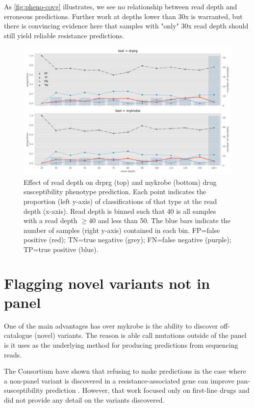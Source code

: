 As \autoref{fig:pheno-covg} illustrates, we see no relationship between \ont{} read depth and erroneous predictions. Further work at depths lower than 30x is warranted, but there is convincing evidence here that samples with "only" 30x \ont{} read depth should still yield reliable resistance predictions. 

\begin{figure}
\begin{center}
\includegraphics[width=0.90\columnwidth]{Chapter3/Figs/phenotype_coverage.png}
\caption{{Effect of \ont{} read depth on drprg (top) and mykrobe (bottom) drug susceptibility phenotype prediction. Each point indicates the proportion (left y-axis) of classifications of that type at the read depth (x-axis). Read depth is binned such that 40 is all samples with a read depth $\ge40$ and less than 50. The blue bars indicate the number of samples (right y-axis) contained in each bin. FP=false positive (red); TN=true negative (grey); FN=false negative (purple); TP=true positive (blue).
{\label{fig:pheno-covg}}
}}
\end{center}
\end{figure}
\section{Flagging novel variants not in panel}
\label{sec:drprg-discover}

One of the main advantages \drprg{} has over mykrobe is the ability to discover off-catalogue (novel) variants. The reason \drprg{} is able call mutations outside of the panel is it uses \pandora{} as the underlying method for producing predictions from sequencing reads.

The \cryptic{} Consortium have shown that refusing to make predictions in the case where a non-panel variant is discovered in a resistance-associated gene can improve pan-susceptibility prediction \cite{cryptic2018}. However, that work focused only on first-line drugs and did not provide any detail on the variants discovered. 

